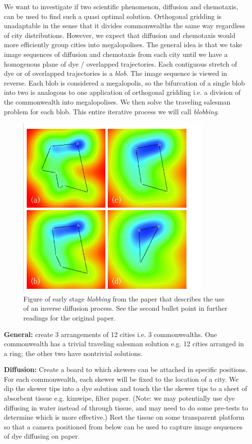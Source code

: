 \begin{enumerate}
\par 
We want to investigate if two scientific phenomenon, diffusion and chemotaxis, can be used to find such a quasi optimal solution. Orthogonal gridding is unadaptable in the sense that it divides commonwealths the same way regardless of city distributions. However, we expect that diffusion and chemotaxis would more efficiently group cities into megalopolises. The general idea is that we take image sequences of diffusion and chemotaxis from each city until we have a homogenous plane of dye / overlapped trajectories. Each contiguous stretch of dye or of overlapped trajectories is a \emph{blob}. The image sequence is viewed in reverse. Each blob is considered a megalopolis, so the bifurcation of a single blob into two is analogous to one application of orthogonal gridding i.e. a division of the commonwealth into megalopolises. We then solve the traveling salesman problem for each blob. This entire iterative process we will call \emph{blobbing}.

\begin{figure}[H]
\centering
\includegraphics{Blob}
\caption{Figure of early stage \emph{blobbing} from the paper that describes the use of an inverse diffusion process. See the second bullet point in further readings for the original paper.}
\end{figure}

\textbf{General:} create 3 arrangements of 12 cities i.e. 3 commonwealths. One commonwealth has a trivial traveling salesman solution e.g. 12 cities arranged in a ring; the other two have nontrivial solutions. 

\par 
\textbf{Diffusion:} Create a board to which skewers can be attached in specific positions. For each commonwealth, each skewer will be fixed to the location of a city. We dip the skewer tips into a dye solution and touch the the skewer tips to a sheet of absorbent tissue e.g. kimwipe, filter paper. (Note: we may potentially use dye diffusing in water instead of through tissue, and may need to do some pre-tests to determine which is more effective.) Rest the tissue on some transparent platform so that a camera positioned from below can be used to capture image sequences of dye diffusing on paper. 


\end{enumerate}
